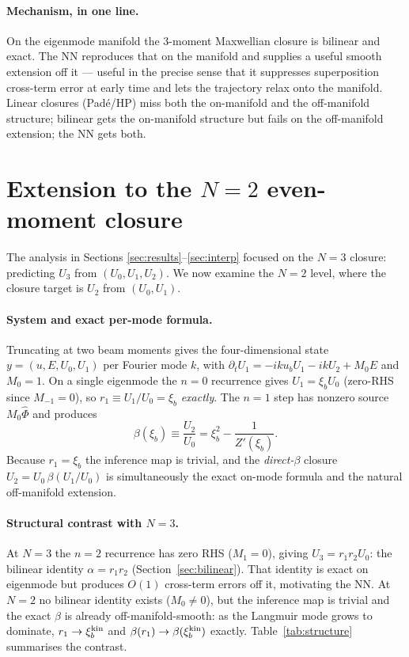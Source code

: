 \documentclass[11pt]{article}
\newcommand{\Phih}{\hat{\Phi}}
\newcommand{\xib}{\xi_b}
\newcommand{\ub}{u_b}
\begin{document}
\paragraph{Mechanism, in one line.} On the eigenmode manifold the
3-moment Maxwellian closure is bilinear and exact. The NN reproduces
that on the manifold and supplies a useful smooth extension off it ---
useful in the precise sense that it suppresses superposition cross-term
error at early time and lets the trajectory relax onto the manifold.
Linear closures (Pad\'e/HP) miss both the on-manifold and the
off-manifold structure; bilinear gets the on-manifold structure but
fails on the off-manifold extension; the NN gets both.

\section{Extension to the \texorpdfstring{$N=2$}{N=2} even-moment closure}
\label{sec:n2}

The analysis in Sections \ref{sec:results}--\ref{sec:interp} focused
on the $N=3$ closure: predicting $U_3$ from $(U_0,U_1,U_2)$.  We now
examine the $N=2$ level, where the closure target is $U_2$ from
$(U_0,U_1)$.

\paragraph{System and exact per-mode formula.}
Truncating at two beam moments gives the four-dimensional state
$y=(u,E,U_0,U_1)$ per Fourier mode $k$, with
$\partial_t U_1 = -ik\ub U_1 - ik U_2 + M_0 E$ and $M_0=1$.
On a single eigenmode the $n=0$ recurrence gives $U_1=\xib U_0$
(zero-RHS since $M_{-1}=0$), so $r_1\equiv U_1/U_0=\xib$
\emph{exactly}.  The $n=1$ step has nonzero source $M_0\Phih$ and
produces
\begin{equation}\label{eq:beta}
  \beta(\xib) \equiv \frac{U_2}{U_0}
               = \xib^2 - \frac{1}{Z'(\xib)}.
\end{equation}
Because $r_1=\xib$ the inference map is trivial, and the
\emph{direct-$\beta$} closure $U_2=U_0\,\beta(U_1/U_0)$ is
simultaneously the exact on-mode formula and the natural off-manifold
extension.

\paragraph{Structural contrast with $N=3$.}
At $N=3$ the $n=2$ recurrence has zero RHS ($M_1=0$), giving
$U_3=r_1 r_2 U_0$: the bilinear identity $\alpha=r_1r_2$
(Section~\ref{sec:bilinear}).  That identity is exact on eigenmode but
produces $O(1)$ cross-term errors off it, motivating the NN.  At
$N=2$ no bilinear identity exists ($M_0\neq0$), but the inference map
is trivial and the exact $\beta$ is already off-manifold-smooth: as
the Langmuir mode grows to dominate, $r_1\to\xib^{\rm kin}$ and
$\beta(r_1)\to\beta(\xib^{\rm kin})$ exactly.
Table~\ref{tab:structure} summarises the contrast.
\end{document}
